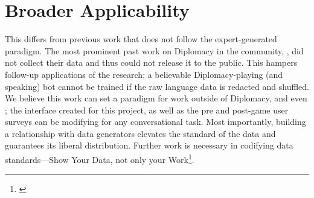 \section{Broader Applicability}

This differs from previous work that does not follow the expert-generated paradigm.  
%
The most prominent past work on Diplomacy in the  community, \citep{niculaelinguistic}, did not collect their data and thus could not release it to the public.  
%
This hampers follow-up applications of the research; a believable Diplomacy-playing (and speaking) bot cannot be trained if the raw language data is redacted and shuffled.  
%
We believe this work can set a paradigm for work outside of Diplomacy, and even ; the interface created for this project, as well as the pre and post-game user surveys can be modifying for any conversational task.  
%
Most importantly, building a relationship with data generators elevates the standard of the data and guarantees its liberal distribution.  
%
Further work is necessary in codifying data standards---Show Your Data, not only your Work\footnote{\citep{dodge2019show}}.
